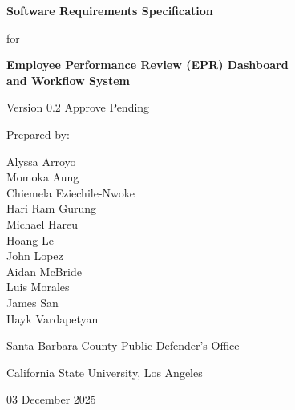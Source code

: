 \documentclass[12pt]{article}
\begin{document}

\begin{titlepage}
\centering
\vspace*{3cm}

{\LARGE \textbf{Software Requirements Specification}\par}
\vspace{1.5cm}

{\large for\par}
\vspace{1cm}

{\LARGE \textbf{Employee Performance Review (EPR) Dashboard}\\
\LARGE \textbf{and Workflow System}\par}
\vspace{1.5cm}

{\normalsize Version 0.2 Approve Pending\par}
\vspace{2cm}

{\normalsize Prepared by:\par}
\vspace{0.8cm}
{\normalsize
Alyssa Arroyo\\
Momoka Aung\\
Chiemela Eziechile-Nwoke\\
Hari Ram Gurung\\
Michael Hareu\\
Hoang Le\\
John Lopez\\
Aidan McBride\\
Luis Morales\\
James San\\
Hayk Vardapetyan\par}
\vspace{2cm}

{\normalsize Santa Barbara County Public Defender’s Office\par}
{\normalsize California State University, Los Angeles\par}

\vfill
{\normalsize 03 December 2025\par}

\clearpage
{}

\end{titlepage}

\begingroup
\singlespacing
\setlength{\parskip}{0pt}
\setlength{\parindent}{0pt}
\tableofcontents
\endgroup
\newpage
\end{document}
